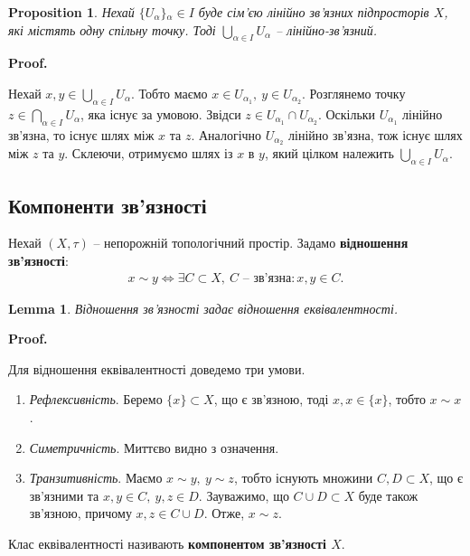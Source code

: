 \documentclass[a4paper, 10pt]{article}
\makeatletter
\theoremstyle{theoremdd}
\newtheorem{proposition}[theorem]{Proposition}
\newtheorem{lemma}[theorem]{Lemma}
\renewenvironment{proof}[1][Proof.\\]{\par
\pushQED{\hfill \qed}%
\normalfont \topsep6\p@\@plus6\p@\relax
\trivlist
\item\relax
{\bfseries
#1\@addpunct{.}}\hspace\labelsep\ignorespaces
}{%
\popQED\endtrivlist\@endpefalse
}
\makeatother
\begin{document}
\begin{proposition}
Нехай $\{U_\alpha\}{_\alpha \in I}$ буде сім'єю лінійно зв'язних підпросторів $X$, які містять одну спільну точку. Тоді $\displaystyle\bigcup_{\alpha \in I} U_\alpha$ -- лінійно-зв'язний.
\end{proposition}

\begin{proof}
Нехай $x,y \in \displaystyle\bigcup_{\alpha \in I} U_\alpha$. Тобто маємо $x \in U_{\alpha_1},\ y \in U_{\alpha_2}$. Розглянемо точку $z \in \displaystyle\bigcap_{\alpha \in I} U_\alpha$, яка існує за умовою. Звідси $z \in U_{\alpha_1} \cap U_{\alpha_2}$. Оскільки $U_{\alpha_1}$ лінійно зв'язна, то існує шлях між $x$ та $z$. Аналогічно $U_{\alpha_2}$ лінійно зв'язна, тож існує шлях між $z$ та $y$. Склеючи, отримуємо шлях із $x$ в $y$, який цілком належить $\displaystyle\bigcup_{\alpha \in I} U_\alpha$.
\end{proof}

\subsection{Компоненти зв'язності}
Нехай $(X,\tau)$ -- непорожній топологічний простір. Задамо \textbf{відношення зв'язності}:
\begin{align*}
x \sim y \iff \exists C \subset X,\ C \text{ -- зв'язна}: x,y \in C.
\end{align*}

\begin{lemma}
Відношення зв'язності задає відношення еквівалентності.
\end{lemma}

\begin{proof}
Для відношення еквівалентності доведемо три умови.
\begin{enumerate}[nosep,wide=0pt,label={\Roman*.}]
\item \textit{Рефлексивність}. Беремо $\{x\} \subset X$, що є зв'язною, тоді $x,x \in \{x\}$, тобто $x \sim x$.
\item \textit{Симетричність}. Миттєво видно з означення.
\item \textit{Транзитивність}. Маємо $x \sim y,\ y \sim z$, тобто існують множини $C, D \subset X$, що є зв'язними та $x,y \in C,\ y,z \in D$. Зауважимо, що $C \cup D \subset X$ буде також зв'язною, причому $x,z \in C \cup D$. Отже, $x \sim z$. \qedhere
\end{enumerate}
\end{proof}
\noindent
Клас еквівалентності називають \textbf{компонентом зв'язності $X$}.
\end{document}
